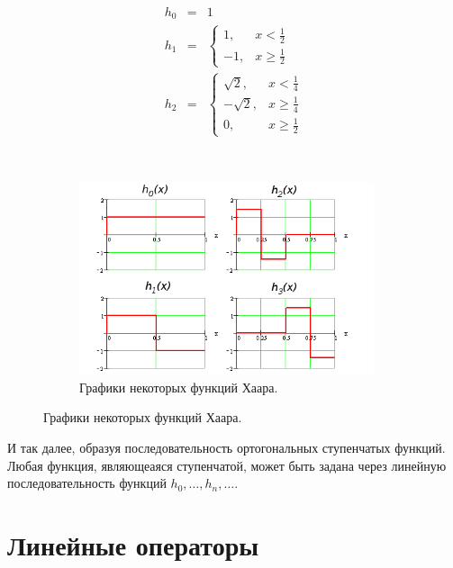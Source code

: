 \documentclass[12pt]{article}
\begin{document}
	\begin{figure}[H]
		\begin{subfigure}[c]{0.5\textwidth}
		\vspace{-40pt}
		\begin{eqnarray*}
			h_0& =& 1 \\		
			h_1& =& 
			\begin{cases}
				1, & x < \frac{1}{2} \\
				-1, & x \geq \frac{1}{2}
			\end{cases} \\		
			h_2& =& 
			\begin{cases}
				\sqrt{2}, & x < \frac{1}{4} \\
				-\sqrt{2}, & x \geq \frac{1}{4} \\
				0, & x \geq \frac{1}{2}
			\end{cases}
		\end{eqnarray*}
		\end{subfigure}
		~
		\begin{subfigure}[c]{0.5\textwidth}
			\includegraphics[width=0.95\textwidth]{../Graphics/Lectures-5-Haar_functions.png}
			\caption{Графики некоторых функций Хаара.}
		\end{subfigure}
	\end{figure}
	
	И так далее, образуя последовательность ортогональных ступенчатых функций. Любая функция, являющеаяся ступенчатой, может
	быть задана через линейную последовательность функций $h_0, \dots, h_n, \dots$.
	
	\section{Линейные операторы}
	
\end{document}
